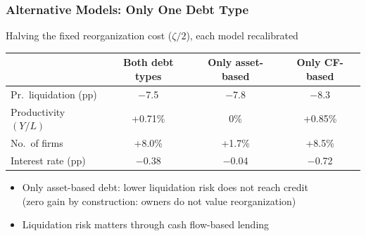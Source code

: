 \documentclass[aspectratio=169,xcolor=table]{beamer}
\begin{document}
\begin{frame}[label=Aggeffects] \frametitle{Alternative Models: Only One Debt Type \hfill \hyperlink{aggregate}{}}

Halving the fixed reorganization cost ($\zeta/2$), each model recalibrated

\small
\begin{table}[H]
    \centering
    \renewcommand{\arraystretch}{0.9}
    \begin{tabular}{lccc}
    & \textbf{Both debt types} & \textbf{Only asset-based} & \textbf{Only CF-based} \\
    \toprule
    Pr.\ liquidation (pp)  & $-$7.5 & $-$7.8 & $-$8.3 \\
    Productivity $(Y/L)$   & +0.71\% & 0\% & +0.85\% \\
    No.\ of firms          & +8.0\% & +1.7\% & +8.5\% \\
    Interest rate (pp)     & $-$0.38 & $-$0.04 & $-$0.72 \\
    \bottomrule
    \end{tabular}
\end{table}
\normalsize

\begin{itemize}
    \item Only asset-based debt: lower liquidation risk does not reach credit \\ \small (zero gain by construction: owners do not value reorganization)
    \item \normalsize Liquidation risk matters through cash flow-based lending
\end{itemize}

\end{frame}
\end{document}
